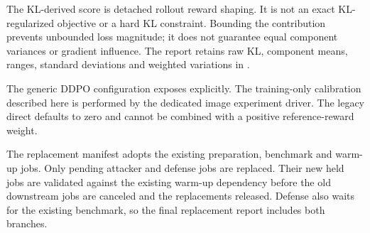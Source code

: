 The KL-derived score is detached rollout reward shaping. It is not an
exact KL-regularized objective or a hard KL constraint. Bounding the
contribution prevents unbounded loss magnitude; it does not guarantee
equal component variances or gradient influence. The report retains raw
KL, component means, ranges, standard deviations and weighted variations
in \texttt{}.

The generic DDPO configuration exposes
\texttt{} explicitly. The training-only
calibration described here is performed by the dedicated image
experiment driver. The legacy direct \texttt{}
defaults to zero and cannot be combined with a positive reference-reward
weight.

The replacement manifest adopts the existing preparation, benchmark and
warm-up jobs. Only pending attacker and defense jobs are replaced. Their
new held jobs are validated against the existing warm-up dependency
before the old downstream jobs are canceled and the replacements
released. Defense also waits for the existing benchmark, so the final
replacement report includes both branches.
